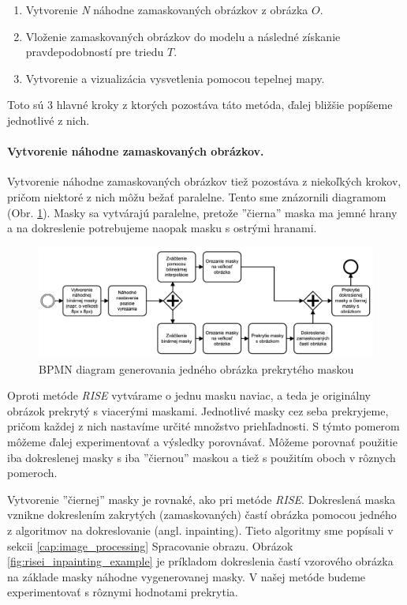 \begin{enumerate}
    \item Vytvorenie \textit{N} náhodne zamaskovaných obrázkov z obrázka $O$.
    \item Vloženie zamaskovaných obrázkov do modelu a následné získanie pravdepodobností pre triedu $T$.
    \item Vytvorenie a vizualizácia vysvetlenia pomocou tepelnej mapy.
\end{enumerate}

Toto sú 3 hlavné kroky z ktorých pozostáva táto metóda, ďalej bližšie popíšeme jednotlivé z nich.

\paragraph{Vytvorenie náhodne zamaskovaných obrázkov.}

Vytvorenie náhodne zamaskovaných obrázkov tiež pozostáva z niekoľkých krokov, pričom niektoré z nich môžu bežať paralelne. Tento sme znázornili diagramom (Obr. \ref{fig:risei_diagram}). Masky sa vytvárajú paralelne, pretože ''čierna'' maska ma jemné hrany a na dokreslenie potrebujeme naopak masku s ostrými hranami.

\begin{figure}[h!]
    \centering
    \includegraphics[scale=0.45]{assets/images/risei_diagram.png}
    \caption{BPMN diagram generovania jedného obrázka prekrytého maskou}
    \label{fig:risei_diagram}
\end{figure}

Oproti metóde \textit{RISE} vytvárame o jednu masku naviac, a teda je originálny obrázok prekrytý s viacerými maskami. Jednotlivé masky cez seba prekryjeme, pričom každej z nich nastavíme určité množstvo priehľadnosti. S týmto pomerom môžeme ďalej experimentovať a výsledky porovnávať. Môžeme porovnať použitie iba dokreslenej masky s iba ''čiernou'' maskou a tiež s použitím oboch v rôznych pomeroch.

Vytvorenie ''čiernej'' masky je rovnaké, ako pri metóde \textit{RISE}. Dokreslená maska vznikne dokreslením zakrytých (zamaskovaných) častí obrázka pomocou jedného z algoritmov na dokreslovanie (angl. inpainting). Tieto algoritmy sme popísali v sekcii \ref{cap:image_processing} Spracovanie obrazu. Obrázok \ref{fig:risei_inpainting_example} je príkladom dokreslenia častí vzorového obrázka na základe masky náhodne vygenerovanej masky. V našej metóde budeme experimentovať s rôznymi hodnotami prekrytia.

